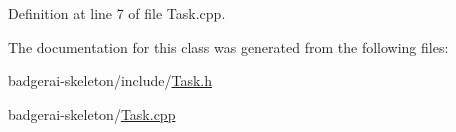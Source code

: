 Definition at line 7 of file Task.\-cpp.


\begin{DoxyCode}
{
}
\end{DoxyCode}


The documentation for this class was generated from the following files\-:\begin{DoxyCompactItemize}
\item 
badgerai-\/skeleton/include/\hyperlink{Task_8h}{Task.\-h}\item 
badgerai-\/skeleton/\hyperlink{Task_8cpp}{Task.\-cpp}\end{DoxyCompactItemize}
